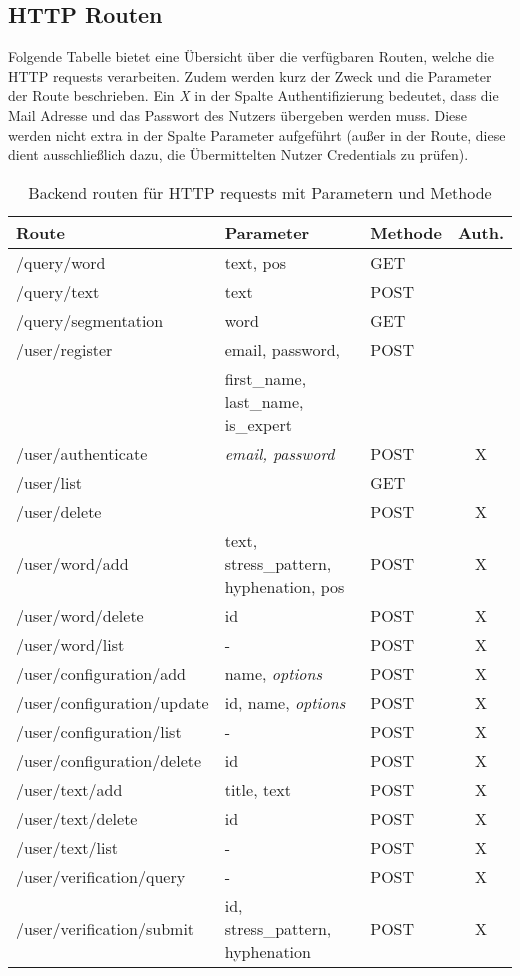 
\subsection{HTTP Routen}
Folgende Tabelle bietet eine Übersicht über die verfügbaren Routen, welche die HTTP requests verarbeiten. Zudem werden kurz der Zweck und die Parameter der Route beschrieben. Ein \textit{X} in der Spalte Authentifizierung bedeutet, dass die Mail Adresse und das Passwort des Nutzers übergeben werden muss. Diese werden nicht extra in der Spalte Parameter aufgeführt (außer in der  Route, diese dient ausschließlich dazu, die Übermittelten Nutzer Credentials zu prüfen).

\begin{table}[h!]
	\centering
	\begin{tabular}{|l|l|l|c|}
		\hline
		\textbf{Route} & \textbf{Parameter} & \textbf{Methode} & \textbf{Auth.}\\
		\hline
		\hline
		/query/word & text, pos & GET & \\
		\hline
		/query/text & text & POST & \\
		\hline
		/query/segmentation& word & GET & \\
		\hline
		\hline
		/user/register & email, password, & POST & \\
		& first\_name, last\_name, is\_expert &&\\
		\hline
		/user/authenticate & \textit{email, password} & POST & X\\
		\hline
		/user/list & \todo{remove} & GET & \\
		\hline
		/user/delete & \todo{implement} & POST & X\\
		\hline
		\hline
		/user/word/add& text, stress\_pattern, hyphenation, pos & POST & X\\
		\hline
		/user/word/delete& id & POST & X\\
		\hline
		/user/word/list & - & POST & X\\
		\hline
		\hline
		/user/configuration/add & name, \textit{options} & POST & X\\
		\hline
		/user/configuration/update & id, name, \textit{options}  & POST & X\\
		\hline
		/user/configuration/list & - & POST & X\\
		\hline
		/user/configuration/delete & id & POST & X\\
		\hline
		\hline
		/user/text/add & title, text & POST & X\\
		\hline
		/user/text/delete & id & POST & X\\
		\hline
		/user/text/list & - & POST & X\\
		\hline
		\hline
		/user/verification/query & - & POST & X\\
		\hline
		/user/verification/submit & id, stress\_pattern, hyphenation & POST & X\\
		\hline
	\end{tabular}
	\caption{Backend routen für HTTP requests mit Parametern und Methode}
	\label{table:backendroutes}
\end{table}

